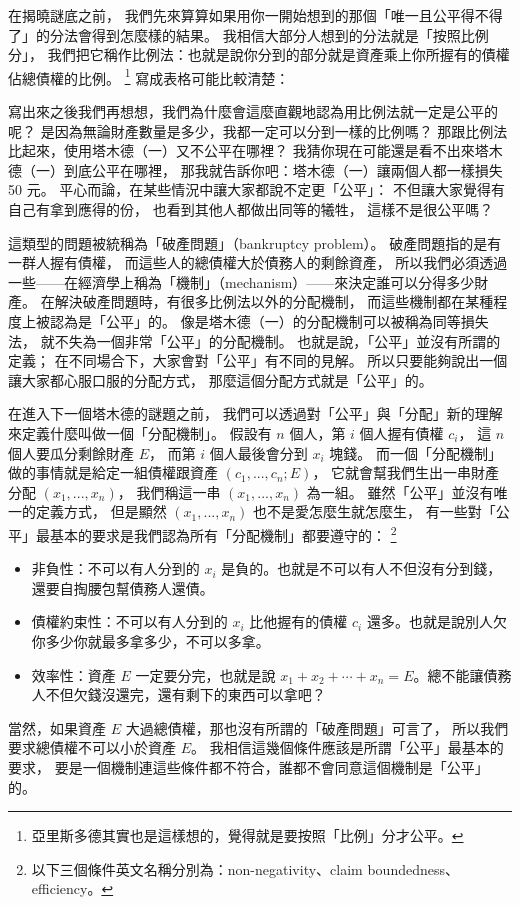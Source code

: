 \documentclass[10pt]{article}
\begin{document}
\begin{multicols*}{2}
\separationline

在揭曉謎底之前，
我們先來算算如果用你一開始想到的那個「唯一且公平得不得了」的分法會得到怎麼樣的結果。
我相信大部分人想到的分法就是「按照比例分」，
我們把它稱作\textsf{比例法}：也就是說你分到的部分就是資產乘上你所握有的債權佔總債權的比例。
\footnote{
	亞里斯多德其實也是這樣想的，覺得就是要按照「比例」分才公平。
}
寫成表格可能比較清楚：

寫出來之後我們再想想，我們為什麼會這麼直觀地認為用\textsf{比例法}就一定是公平的呢？
是因為無論財產數量是多少，我都一定可以分到一樣的比例嗎？
那跟\textsf{比例法}比起來，使用\textsf{塔木德（一）}又不公平在哪裡？
我猜你現在可能還是看不出來\textsf{塔木德（一）}到底公平在哪裡，
那我就告訴你吧：\textsf{塔木德（一）}讓兩個人都一樣損失 50 元。
平心而論，在某些情況中讓大家都說不定更「公平」：
不但讓大家覺得有自己有拿到應得的份，
也看到其他人都做出同等的犧牲，
這樣不是很公平嗎？

這類型的問題被統稱為「破產問題」（bankruptcy problem）。
破產問題指的是有一群人握有債權，
而這些人的總債權大於債務人的剩餘資產，
所以我們必須透過一些——在經濟學上稱為「機制」（mechanism）——來決定誰可以分得多少財產。
在解決破產問題時，有很多\textsf{比例法}以外的分配機制，
而這些機制都在某種程度上被認為是「公平」的。
像是\textsf{塔木德（一）}的分配機制可以被稱為\textsf{同等損失法}，
就不失為一個非常「公平」的分配機制。
也就是說，「公平」並沒有所謂的定義；
在不同場合下，大家會對「公平」有不同的見解。
所以只要能夠說出一個讓大家都心服口服的分配方式，
那麼這個分配方式就是「公平」的。

在進入下一個塔木德的謎題之前，
我們可以透過對「公平」與「分配」新的理解來定義什麼叫做一個「分配機制」。
假設有 $n$ 個人，第 $i$ 個人握有債權 $c_i$，
這 $n$ 個人要瓜分剩餘財產 $E$，
而第 $i$ 個人最後會分到 $x_i$ 塊錢。
而一個「分配機制」做的事情就是給定一組債權跟資產 $(c_1,...,c_n;E)$，
它就會幫我們生出一串財產分配 $(x_1,...,x_n)$，
我們稱這一串 $(x_1,...,x_n)$ 為一組。
雖然「公平」並沒有唯一的定義方式，
但是顯然 $(x_1,...,x_n)$ 也不是愛怎麼生就怎麼生，
有一些對「公平」最基本的要求是我們認為所有「分配機制」都要遵守的：
\footnote{以下三個條件英文名稱分別為：non-negativity、claim boundedness、efficiency。}
\begin{itemize}
	\item \textsf{非負性}：不可以有人分到的 $x_i$ 是負的。也就是不可以有人不但沒有分到錢，還要自掏腰包幫債務人還債。
	\item \textsf{債權約束性}：不可以有人分到的 $x_i$ 比他握有的債權 $c_i$ 還多。也就是說別人欠你多少你就最多拿多少，不可以多拿。
	\item \textsf{效率性}：資產 $E$ 一定要分完，也就是說 $x_1 + x_2 + \cdots + x_n = E$。總不能讓債務人不但欠錢沒還完，還有剩下的東西可以拿吧？
\end{itemize}
當然，如果資產 $E$ 大過總債權，那也沒有所謂的「破產問題」可言了，
所以我們要求總債權不可以小於資產 $E$。
我相信這幾個條件應該是所謂「公平」最基本的要求，
要是一個機制連這些條件都不符合，誰都不會同意這個機制是「公平」的。


\end{multicols*}
\end{document}
